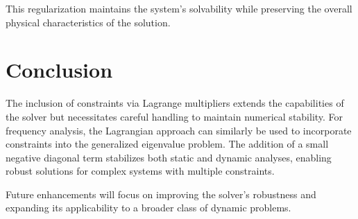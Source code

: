 This regularization maintains the system's solvability while preserving the overall physical characteristics of the solution.

\section{Conclusion}

The inclusion of constraints via Lagrange multipliers extends the capabilities of the solver but necessitates careful handling to maintain numerical stability. For frequency analysis, the Lagrangian approach can similarly be used to incorporate constraints into the generalized eigenvalue problem. The addition of a small negative diagonal term stabilizes both static and dynamic analyses, enabling robust solutions for complex systems with multiple constraints.

Future enhancements will focus on improving the solver's robustness and expanding its applicability to a broader class of dynamic problems.
